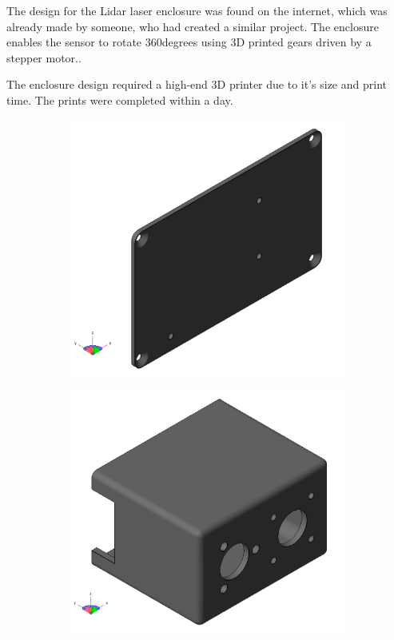 
The design for the Lidar laser enclosure was found on the internet, which was already made by someone, who had created a similar project. The enclosure enables the sensor to rotate 360degrees using 3D printed gears driven by a stepper motor.\cite{lidarenclosure}.

The enclosure design required a high-end 3D printer due to it's size and print time. The prints were completed within a day.

\begin{figure}[H]
	\centering
	\begin{subfigure}[H]{0.4\textwidth}
		\includegraphics[width=\textwidth]{images/lidarcase-base.png}
	\end{subfigure}%
	\quad
	\begin{subfigure}[H]{0.4\textwidth}
		\includegraphics[width=\textwidth]{images/lidarcase-mount.png}

\end{subfigure}
\end{figure}
